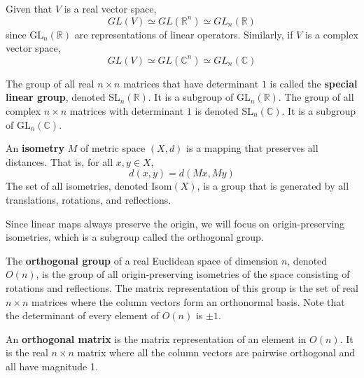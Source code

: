   \begin{theorem}
    Given that $V$ is a real vector space, 
    \begin{equation}
      GL(V) \simeq GL(\mathbb{R}^n) \simeq GL_n (\mathbb{R})
    \end{equation}
    since GL$_n(\mathbb{R})$ are representations of linear operators. Similarly, if $V$ is a complex vector space, 
    \begin{equation}
      GL(V) \simeq GL(\mathbb{C}^n) \simeq GL_n (\mathbb{C})
    \end{equation}
  \end{theorem}

  \begin{definition}
    The group of all real $n \times n$ matrices that have determinant $1$ is called the \textbf{special linear group}, denoted SL$_n (\mathbb{R})$. It is a subgroup of GL$_n (\mathbb{R})$. The group of all complex $n \times n$ matrices with determinant $1$ is denoted SL$_n (\mathbb{C})$. It is a subgroup of GL$_n(\mathbb{C})$. 
  \end{definition}

  \begin{definition}[Isometry]
    An \textbf{isometry} $M$ of metric space $(X, d)$ is a mapping that preserves all distances. That is, for all $x, y \in X$, 
    \begin{equation}
      d(x, y) = d(M x, M y) 
    \end{equation}
    The set of all isometries, denoted Isom$(X)$, is a group that is generated by all translations, rotations, and reflections. 
  \end{definition}

  Since linear maps always preserve the origin, we will focus on origin-preserving isometries, which is a subgroup called the orthogonal group.

  \begin{definition}
    The \textbf{orthogonal group} of a real Euclidean space of dimension $n$, denoted $O(n)$, is the group of all origin-preserving isometries of the space consisting of rotations and reflections. The matrix representation of this group is the set of real $n \times n$ matrices where the column vectors form an orthonormal basis. Note that the determinant of every element of $O(n)$ is $\pm 1$. 
  \end{definition}

  \begin{definition}
    An \textbf{orthogonal matrix} is the matrix representation of an element in $O(n)$. It is the real $n \times n$ matrix where all the column vectors are pairwise orthogonal and all have magnitude 1. 
  \end{definition}

